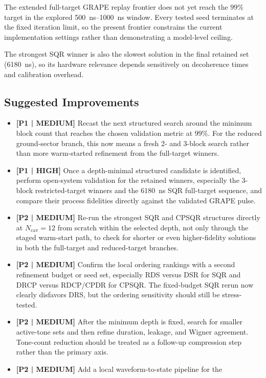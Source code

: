 ﻿\documentclass[aps,pra,twocolumn,reprint,amsmath,amssymb,floatfix]{revtex4-2}
\begin{document}
The extended full-target GRAPE replay frontier does not yet reach the $99\%$
target in the explored \SIrange{500}{1000}{ns} window. Every tested seed
terminates at the fixed iteration limit, so the present frontier constrains the
current implementation settings rather than demonstrating a model-level ceiling.

The strongest SQR winner is also the slowest solution in the final retained set
(\SI{6180}{ns}), so its hardware relevance depends sensitively on decoherence
times and calibration overhead.

\subsection{Suggested Improvements}

\begin{itemize}
  \item \textbf{[P1 | MEDIUM]} Recast the next structured search around the
  minimum block count that reaches the chosen validation metric at $99\%$.
  For the reduced ground-sector branch, this now means a fresh 2- and 3-block
  search rather than more warm-started refinement from the full-target winners.
  \item \textbf{[P1 | HIGH]} Once a depth-minimal structured candidate is
  identified, perform open-system validation for the retained winners,
  especially the 3-block restricted-target winners and the \SI{6180}{ns} SQR
  full-target sequence, and compare their process fidelities directly against
  the validated GRAPE pulse.
  \item \textbf{[P2 | MEDIUM]} Re-run the strongest SQR and CPSQR structures
  directly at $N_{\mathrm{cav}}=12$ from scratch within the selected depth,
  not only through the staged warm-start path, to check for shorter or even
  higher-fidelity solutions in both the full-target and reduced-target branches.
  \item \textbf{[P2 | MEDIUM]} Confirm the local ordering rankings with a
  second refinement budget or seed set, especially RDS versus DSR for SQR and
  DRCP versus RDCP/CPDR for CPSQR. The fixed-budget SQR rerun now clearly
  disfavors DRS, but the ordering sensitivity should still be stress-tested.
  \item \textbf{[P2 | MEDIUM]} After the minimum depth is fixed, search for
  smaller active-tone sets and then refine duration, leakage, and Wigner
  agreement. Tone-count reduction should be treated as a follow-up compression
  step rather than the primary axis.
  \item \textbf{[P2 | MEDIUM]} Add a local waveform-to-state pipeline for the

\end{itemize}
\end{document}
